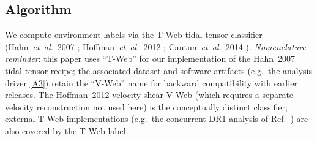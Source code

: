 \documentclass[aps,prd,twocolumn,superscriptaddress,showpacs,preprintnumbers,nofootinbib,longbibliography,floatfix]{revtex4-2}
\newcommand{\repoBase}{https://github.com/Hubify-Projects/bigbounce/blob/main}
\begin{document}
\subsection{Algorithm}\label{sec:vweb_algo}

We compute environment labels via the T-Web tidal-tensor classifier
(Hahn~\textit{et~al.}~2007 \cite{Hahn2007};
Hoffman~\textit{et~al.}~2012 \cite{Hoffman2012};
Cautun~\textit{et~al.}~2014 \cite{Cautun2014}).
\emph{Nomenclature reminder}: this
paper uses ``T-Web'' for our implementation of the Hahn~2007
tidal-tensor recipe; the associated dataset and software artifacts (e.g.\ the
analysis driver
\href{\repoBase/pipelines/p5\_desi\_chirality/env\_finder/01\_compute\_vweb.py}{[A3]})
retain the ``V-Web'' name for backward compatibility with earlier
releases. The Hoffman~2012 velocity-shear V-Web (which requires a separate
velocity reconstruction not used here) is the conceptually distinct
classifier; external T-Web implementations (e.g.\ the concurrent
DR1 analysis of Ref.~\cite{TWebDESI2026}) are also covered by the
T-Web label.
\end{document}
